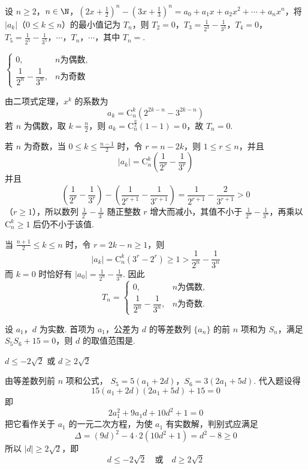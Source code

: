 \begin{problem}
设 \(n \geqslant 2\)，\(n \in \N\)，\(\left(2x + \frac{1}{2}\right)^n - \left(3x + \frac{1}{3}\right)^n = a_0 + a_1x + a_2x^2 + \cdots + a_nx^n\)，将 \(|a_k|\)（\(0 \leqslant k \leqslant n\)）的最小值记为 \(T_n\)，则 \(T_2 = 0\)，\(T_3 = \frac{1}{2^3} - \frac{1}{3^3}\)，\(T_4 = 0\)，\(T_5 = \frac{1}{2^5} - \frac{1}{3^5}\)，\(\cdots\)，\(T_n\)，\(\cdots\)，其中 \(T_n = \)\fillinblank{}.
\begin{answer}
\(\begin{cases}
0, & n\text{为偶数},\\
\dfrac{1}{2^n}-\dfrac{1}{3^n}, & n\text{为奇数}
\end{cases}\)
\end{answer}

\begin{solution}
由二项式定理，\(x^k\) 的系数为
\[
a_k=\mathrm C_n^k\left(2^{2k-n}-3^{2k-n}\right)
\]
若 \(n\) 为偶数，取 \(k=\frac n2\)，则 \(a_k=\mathrm C_n^{\frac{n}{2}}(1-1)=0\)，故 \(T_n=0\).

若 \(n\) 为奇数，当 \(0\leqslant k\leqslant\frac{n-1}{2}\) 时，令 \(r=n-2k\)，则 \(1\leqslant r\leqslant n\)，并且
\[
|a_k|=\mathrm C_n^k\left(\frac1{2^r}-\frac1{3^r}\right)
\]
并且
\[
\left(\frac1{2^r}-\frac1{3^r}\right)
-\left(\frac1{2^{r+1}}-\frac1{3^{r+1}}\right)
=\frac1{2^{r+1}}-\frac2{3^{r+1}}>0
\]
（\(r\geqslant1\)），所以数列 \(\frac1{2^r}-\frac1{3^r}\) 随正整数 \(r\) 增大而减小，其值不小于 \(\frac1{2^n}-\frac1{3^n}\)，再乘以 \(\mathrm C_n^k\geqslant1\) 后仍不小于该值.

当 \(\frac{n+1}{2}\leqslant k\leqslant n\) 时，令 \(r=2k-n\geqslant1\)，则
\[
|a_k|=\mathrm C_n^k(3^r-2^r)\geqslant1>\frac1{2^n}-\frac1{3^n}
\]
而 \(k=0\) 时恰好有 \(|a_0|=\frac1{2^n}-\frac1{3^n}\). 因此
\[
T_n=\begin{cases}
0, & n\text{为偶数},\\
\dfrac1{2^n}-\dfrac1{3^n}, & n\text{为奇数}.
\end{cases}
\]
\end{solution}
\end{problem}

\begin{problem}
设 \(a_1\)，\(d\) 为实数. 首项为 \(a_1\)，公差为 \(d\) 的等差数列 \(\{a_n\}\) 的前 \(n\) 项和为 \(S_n\)，满足 \(S_5S_6 + 15 = 0\)，则 \(d\) 的取值范围是\fillinblank{}.
\begin{answer}
\(d \leqslant -2\sqrt{2}\) 或 \(d \geqslant 2\sqrt{2}\)
\end{answer}

\begin{solution}
由等差数列前 \(n\) 项和公式，
\(S_5=5(a_1+2d)\)，\(S_6=3(2a_1+5d)\).
代入题设得
\[
15(a_1+2d)(2a_1+5d)+15=0
\]
即
\[
2a_1^2+9a_1d+10d^2+1=0
\]
把它看作关于 \(a_1\) 的一元二次方程，为使 \(a_1\) 有实数解，判别式应满足
\[
\Delta=(9d)^2-4\cdot2(10d^2+1)=d^2-8\geqslant0
\]
所以 \(|d|\geqslant2\sqrt2\)，即
\[
d\leqslant-2\sqrt2\quad\text{或}\quad d\geqslant2\sqrt2
\]
\end{solution}
\end{problem}

